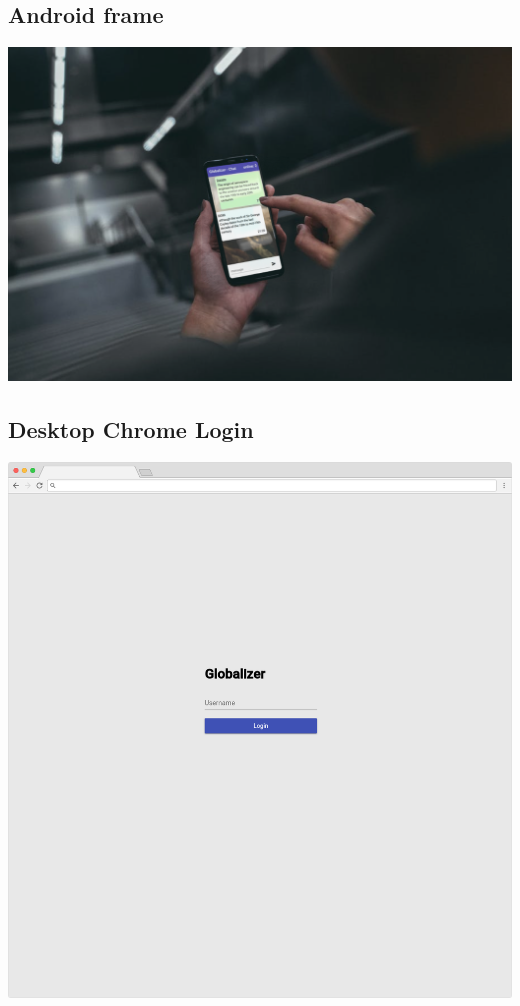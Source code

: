 \documentclass[12pt]{article}
\begin{document}
        \subsection{Android frame}
        \includegraphics[width=\textwidth]{mock-chat.png}
        \subsection{Desktop Chrome Login}
        \includegraphics[width=\textwidth]{frame-desktop-login.png}
        
\end{document}
